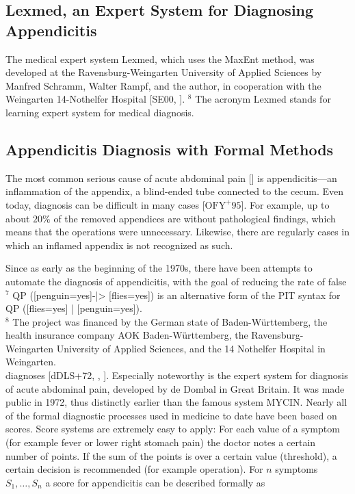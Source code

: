 \documentclass[10pt]{book}
\begin{document}
\subsection{Lexmed, an Expert System for Diagnosing Appendicitis}
The medical expert system Lexmed, which uses the MaxEnt method, was developed at the Ravensburg-Weingarten University of Applied Sciences by Manfred Schramm, Walter Rampf, and the author, in cooperation with the Weingarten 14-Nothelfer Hospital [SE00, \cite{le999}]. ${ }^{8}$ The acronym Lexmed stands for learning expert system for medical diagnosis.

\subsection{Appendicitis Diagnosis with Formal Methods}
The most common serious cause of acute abdominal pain [\cite{dd91}] is appendicitis—an inflammation of the appendix, a blind-ended tube connected to the cecum. Even today, diagnosis can be difficult in many cases [$\mathrm{OFY}^{+} 95$]. For example, up to about $20 \%$ of the removed appendices are without pathological findings, which means that the operations were unnecessary. Likewise, there are regularly cases in which an inflamed appendix is not recognized as such.

Since as early as the beginning of the 1970s, there have been attempts to automate the diagnosis of appendicitis, with the goal of reducing the rate of false\\
${ }^{7}$ QP ([penguin=yes]-|> [flies=yes]) is an alternative form of the PIT syntax for QP ([flies=yes] | [penguin=yes]).\\
${ }^{8}$ The project was financed by the German state of Baden-Württemberg, the health insurance company AOK Baden-Württemberg, the Ravensburg-Weingarten University of Applied Sciences, and the 14 Nothelfer Hospital in Weingarten.\\[0pt]
diagnoses [dDLS+72, \cite{opb94}, \cite{ofy95}]. Especially noteworthy is the expert system for diagnosis of acute abdominal pain, developed by de Dombal in Great Britain. It was made public in 1972, thus distinctly earlier than the famous system MYCIN.
Nearly all of the formal diagnostic processes used in medicine to date have been based on scores. Score systems are extremely easy to apply: For each value of a symptom (for example fever or lower right stomach pain) the doctor notes a certain number of points. If the sum of the points is over a certain value (threshold), a certain decision is recommended (for example operation). For $n$ symptoms $S_{1}, \ldots, S_{n}$ a score for appendicitis can be described formally as
\end{document}
